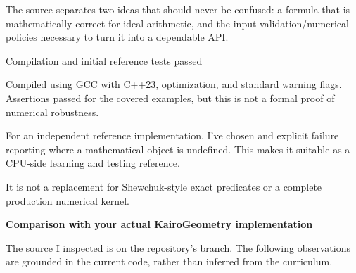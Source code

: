 The source separates two ideas that should never be confused: a formula that is mathematically correct for ideal arithmetic, and the input-validation/numerical policies necessary to turn it into a dependable API.

Compilation and initial reference tests passed

Compiled using GCC with C++23, optimization, and standard warning flags. Assertions passed for the covered examples, but this is not a formal proof of numerical robustness.

For an independent reference implementation, I've chosen  and explicit  failure reporting where a mathematical object is undefined. This makes it suitable as a CPU-side learning and testing reference.

It is not a replacement for Shewchuk-style exact predicates or a complete production numerical kernel.

\textbf{Comparison with your actual KairoGeometry implementation}

The source I inspected is on the repository's  branch. The following observations are grounded in the current code, rather than inferred from the curriculum.

